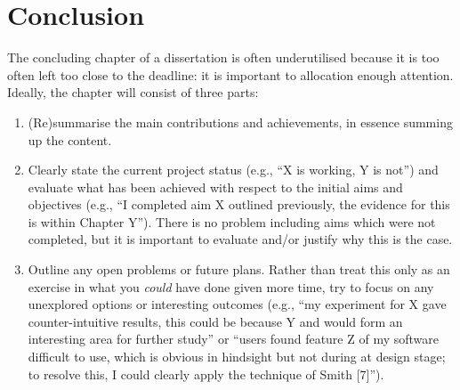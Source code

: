 \documentclass[ %
                    author={Lucas O'Dowd-Jones},
                supervisor={Dr. Alex Kavvos},
                    degree={MEng},
                     title={Variations on Normalisation by Evaluation in Haskell},
                  subtitle={},
                      type={programming languages},
                      year={2021} ]{dissertation}
\begin{document}

\chapter{Conclusion}
\label{chap:conclusion}


\noindent
The concluding chapter of a dissertation is often underutilised because it 
is too often left too close to the deadline: it is important to allocation
enough attention.  Ideally, the chapter will consist of three parts:

\begin{enumerate}
\item (Re)summarise the main contributions and achievements, in essence
      summing up the content.
\item Clearly state the current project status (e.g., ``X is working, Y 
      is not'') and evaluate what has been achieved with respect to the 
      initial aims and objectives (e.g., ``I completed aim X outlined 
      previously, the evidence for this is within Chapter Y'').  There 
      is no problem including aims which were not completed, but it is 
      important to evaluate and/or justify why this is the case.
\item Outline any open problems or future plans.  Rather than treat this
      only as an exercise in what you {\em could} have done given more 
      time, try to focus on any unexplored options or interesting outcomes
      (e.g., ``my experiment for X gave counter-intuitive results, this 
      could be because Y and would form an interesting area for further 
      study'' or ``users found feature Z of my software difficult to use,
      which is obvious in hindsight but not during at design stage; to 
      resolve this, I could clearly apply the technique of Smith [7]'').
\end{enumerate}


%
%
\end{document}
